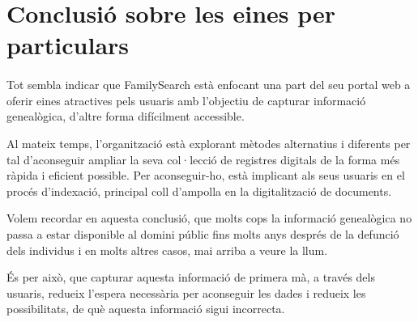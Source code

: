 \section{Conclusió sobre les eines per particulars}

    \paragraph{}
    Tot sembla indicar que  FamilySearch està enfocant una part del seu portal web a oferir eines atractives pels usuaris amb l'objectiu de capturar informació genealògica, d'altre forma difícilment accessible.

    Al mateix temps, l’organització està explorant mètodes alternatius i diferents per tal d’aconseguir ampliar la seva col·lecció de registres digitals de la forma més ràpida i eficient possible. Per aconseguir-ho, està implicant als seus usuaris en el procés d’indexació, principal coll d'ampolla en la digitalització de documents.

    Volem recordar en aquesta conclusió, que molts cops la informació genealògica no passa a estar disponible al domini públic fins molts anys després de la defunció dels individus i en molts altres casos, mai arriba a veure la llum.

    És per això, que capturar aquesta informació de primera mà, a través dels usuaris, redueix l'espera necessària per aconseguir les dades i redueix les po\-ssi\-bi\-li\-tats, de què aquesta informació sigui incorrecta.
